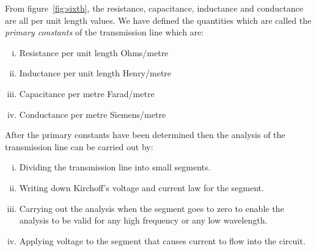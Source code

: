 From figure~\ref{fig:sixth}, the resistance, capacitance, inductance and conductance are all per unit length values. We have defined the quantities which are called the \textit{primary constants} of the transmission line which are:
\begin{enumerate}[(i)]
\item Resistance per unit length \textemdash\; Ohms/metre
\item Inductance per unit length \textemdash\; Henry/metre
\item Capacitance per metre \textemdash\; Farad/metre
\item Conductance per metre \textemdash\; Siemens/metre
\end{enumerate}
After the primary constants have been determined then the analysis of the transmission line can be carried out by:
\begin{enumerate}[(i)]

\item Dividing the transmission line into small segments.
\item Writing down Kirchoff's voltage and current law for the segment.
\item Carrying out the analysis when the segment goes to zero to enable the analysis to be valid for any high frequency or any low wavelength. 
\item Applying voltage to the segment that causes current to flow into the circuit.
\end{enumerate}

